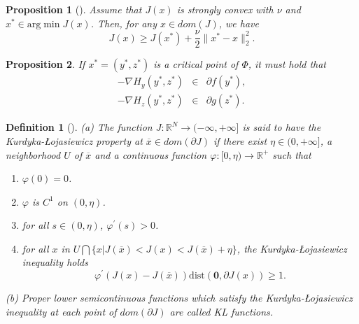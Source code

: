 \documentclass[12pt]{article}
\newtheorem{proposition}{Proposition}
\newtheorem{definition}{Definition}
\begin{document}
\begin{proposition}[\cite{nesterov2004introductory}]\label{sconvex}
Assume that $J(x)$ is strongly convex with $\nu$ and $x^*\in \textrm{arg}\min J(x)$. Then, for any $x\in dom(J)$, we have
\begin{equation}
    J(x)\geq J(x^*)+\frac{\nu}{2}\|x^*-x\|_2^2.
\end{equation}
\end{proposition}

\begin{proposition}\label{criL}
If $x^*=(y^*,z^*)$ is a critical point of $\Phi$, it must hold that
\begin{eqnarray}
 -\nabla H_{y}(y^*,z^*)&\in& \partial f(y^{*}),\nonumber\\
-\nabla H_{z}(y^*,z^*)&\in& \partial g(z^{*}).
\end{eqnarray}
\end{proposition}

\begin{definition}[\cite{bolte2014proximal,attouch2013convergence}]\label{KL}
(a) The function $J: \mathbb{R}^N \rightarrow (-\infty, +\infty]$ is said to have the  Kurdyka-{\L}ojasiewicz property at $\overline{x}\in dom(\partial J)$ if there
 exist $\eta\in (0, +\infty]$, a neighborhood $U$ of $\overline{x}$ and a continuous function $\varphi: [0, \eta)\rightarrow \mathbb{R}^+$ such that
\begin{enumerate}
  \item $\varphi(0)=0$.
  \item $\varphi$ is $C^1$ on $(0, \eta)$.
  \item for all $s\in(0, \eta)$, $\varphi^{'}(s)>0$.
  \item for all $x$ in $U\bigcap\{x|J(\overline{x})<J(x)<J(\overline{x})+\eta\}$, the Kurdyka-{\L}ojasiewicz inequality holds
\begin{equation}
  \varphi^{'}(J(x)-J(\overline{x}))\textrm{dist}(\textbf{0},\partial J(x))\geq 1.
\end{equation}
\end{enumerate}

(b) Proper lower semicontinuous functions which satisfy the Kurdyka-{\L}ojasiewicz inequality at each point of $dom(\partial J)$ are called KL functions.
\end{definition}
\end{document}
